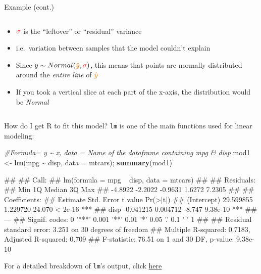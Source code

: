 \documentclass[
  ignorenonframetext,
  aspectratio=169]{beamer}
\newenvironment{Shaded}{\begin{snugshade}}{\end{snugshade}}
\newcommand{\AttributeTok}[1]{\textcolor[rgb]{0.13,0.29,0.53}{#1}}
\newcommand{\CommentTok}[1]{\textcolor[rgb]{0.56,0.35,0.01}{\textit{#1}}}
\newcommand{\FunctionTok}[1]{\textcolor[rgb]{0.13,0.29,0.53}{\textbf{#1}}}
\newcommand{\NormalTok}[1]{#1}
\newcommand{\OtherTok}[1]{\textcolor[rgb]{0.56,0.35,0.01}{#1}}
\newcommand{\SpecialCharTok}[1]{\textcolor[rgb]{0.81,0.36,0.00}{\textbf{#1}}}
\providecommand{\tightlist}{%
  \setlength{\itemsep}{0pt}\setlength{\parskip}{0pt}}
\let\oldShaded\Shaded %
\let\endoldShaded\endShaded
\renewenvironment{Shaded}{\scriptsize\oldShaded}{\endoldShaded}
\let\oldverbatim\verbatim %
\let\endoldverbatim\endverbatim
\renewenvironment{verbatim}{\tiny\oldverbatim}{\endoldverbatim}
\begin{document}
\begin{frame}{Example (cont.)}
\begin{columns}[T]
\begin{column}{0.48\textwidth}
\begin{itemize}[<+->]
\tightlist
\item
  \(\textcolor{red}{\sigma}\) is the ``leftover'' or ``residual''
  variance
\item
  i.e.~variation between samples that the model couldn't explain
\item
  Since
  \(y\sim Normal(\textcolor{orange}{\hat{y}},\textcolor{red}{\sigma})\),
  this means that points are normally distributed around the
  \emph{entire line} of \(\textcolor{orange}{\hat{y}}\)
\item
  If you took a vertical slice at each part of the x-axis, the
  distribution would be \emph{Normal}
\end{itemize}
\end{column}
\end{columns}
\end{frame}

\begin{frame}[fragile]{How do I get R to fit this model?}
\protect\hypertarget{how-do-i-get-r-to-fit-this-model}{}
\texttt{lm} is one of the main functions used for linear modeling:

\begin{Shaded}
\begin{Highlighting}[]
\CommentTok{\#Formula= y \textasciitilde{} x, data = Name of the dataframe containing mpg \& disp}
\NormalTok{mod1 }\OtherTok{\textless{}{-}} \FunctionTok{lm}\NormalTok{(mpg }\SpecialCharTok{\textasciitilde{}}\NormalTok{ disp, }\AttributeTok{data =}\NormalTok{ mtcars); }\FunctionTok{summary}\NormalTok{(mod1)}
\end{Highlighting}
\end{Shaded}

\begin{verbatim}
## 
## Call:
## lm(formula = mpg ~ disp, data = mtcars)
## 
## Residuals:
##     Min      1Q  Median      3Q     Max 
## -4.8922 -2.2022 -0.9631  1.6272  7.2305 
## 
## Coefficients:
##              Estimate Std. Error t value Pr(>|t|)    
## (Intercept) 29.599855   1.229720  24.070  < 2e-16 ***
## disp        -0.041215   0.004712  -8.747 9.38e-10 ***
## ---
## Signif. codes:  0 '***' 0.001 '**' 0.01 '*' 0.05 '.' 0.1 ' ' 1
## 
## Residual standard error: 3.251 on 30 degrees of freedom
## Multiple R-squared:  0.7183, Adjusted R-squared:  0.709 
## F-statistic: 76.51 on 1 and 30 DF,  p-value: 9.38e-10
\end{verbatim}

For a detailed breakdown of \texttt{lm}'s output, click
\href{https://stats.stackexchange.com/questions/5135/interpretation-of-rs-lm-output}{here}
\end{frame}
\end{document}
